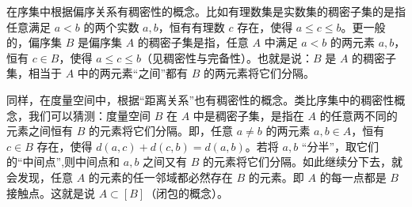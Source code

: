 
在序集中根据偏序关系有稠密性的概念。比如有理数集是实数集的稠密子集的是指任意满足 $a<b$ 的两个实数 $a,b$，恒有有理数 $c$ 存在，使得 $a\leq c\leq b$。更一般的，偏序集 $B$ 是偏序集 $A$ 的稠密子集是指，任意 $A$ 中满足 $a<b$ 的两元素 $a,b$，恒有 $c\in B$，使得 $a\leq c\leq b$（见稠密性与完备性）。也就是说：$B$ 是 $A$ 的稠密子集，相当于 $A$ 中的两元素“之间”都有 $B$ 的两元素将它们分隔。

同样，在度量空间中，根据“距离关系”也有稠密性的概念。类比序集中的稠密性概念，我们可以猜测：度量空间 $B$ 在 $A$ 中是稠密子集，是指在 $A$ 的任意两不同的元素之间恒有 $B$ 的元素将它们分隔。即，任意 $a\neq b$ 的两元素 $a,b\in A$，恒有 $c\in B$ 存在，使得 $d(a,c)+d(c,b)=d(a,b)$。若将 $a,b$ “分半”，取它们的“中间点”,则中间点和 $a,b$ 之间又有 $B$ 的元素将它们分隔。如此继续分下去，就会发现，任意 $A$ 的元素的任一邻域都必然存在 $B$ 的元素。即 $A$ 的每一点都是 $B$ 接触点。这就是说 $A\subset [B]$（闭包的概念）。

